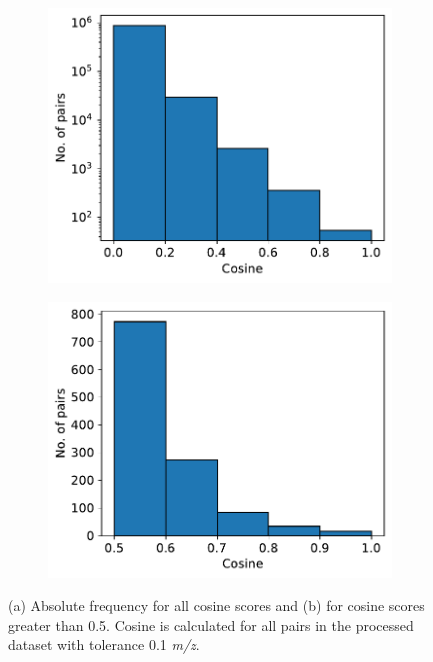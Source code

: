 \begin{figure}[h]
    \centering
	 \begin{subfigure}[b]{0.48\textwidth}
 		 \hspace{3cm} 
 		 \centering
 		 \includegraphics[width=1\textwidth]{include/img/results/cosine_pairs_log.pdf}
 		 \caption{}
 	\end{subfigure}
 	\hfill
 		 \begin{subfigure}[b]{0.48\textwidth}
 		 \hspace{3cm}
 		 \centering
  		\includegraphics[width=1\textwidth]{include/img/results/cosine_pairs_05.pdf}
 		 \caption{}
 	\end{subfigure}
  \caption{(a) Absolute frequency for all cosine scores and (b) for cosine scores greater than 0.5. Cosine is calculated for all pairs in the processed dataset with tolerance 0.1 \textit{m/z}.}
  \label{fig:frequency_cosine}
\end{figure}

